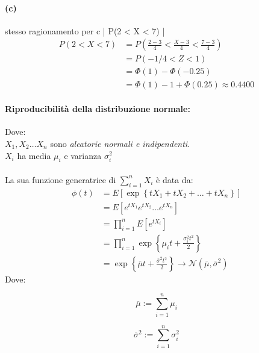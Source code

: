 \documentclass[]{article}
\begin{document}
    \paragraph{(c)} stesso ragionamento per c | P(2 < X < 7) |
    \begin{equation*}
        \begin{split}
            P(2 < X < 7) &= P(\frac{2 - 3}{4} < \frac{X - 3}{4} < \frac{7 - 3}{4}) \\
            &= P(-1/4 < Z < 1) \\
            &= \Phi(1) - \Phi(-0.25) \\
            &= \Phi(1) - 1 + \Phi(0.25) \approx 0.4400
        \end{split}
    \end{equation*}

    \paragraph{Riproducibilità della distribuzione normale:} Dove: \\
    $X_1, X_2 \ldots X_n$ sono \textit{aleatorie normali e indipendenti}. \\ 
    $X_i$ ha media $\mu_i$ e varianza $\sigma^{2}_i$ \\ \\
    La sua funzione generatrice di $\sum_{i = 1}^{n} X_i$ è data da:
    \begin{equation}
        \begin{aligned}
            \phi(t) & =E\left[\exp \left\{t X_1+t X_2+\ldots+t X_n\right\}\right] \\
            & =E\left[e^{t X_1} e^{t X_2} \ldots e^{t X_n}\right] \\
            & =\prod_{i=1}^n E\left[e^{t X_i}\right] \\
            & =\prod_{i=1}^n \exp \left\{\mu_i t+\frac{\sigma_i^2 t^2}{2}\right\} \\
            & =\exp \left\{\bar{\mu} t+\frac{\bar{\sigma}^2 t^2}{2}\right\} \longrightarrow \mathcal{N}(\overline{\mu}, \overline{\sigma}^2)
        \end{aligned}
    \end{equation}
    Dove: \\
    \begin{minipage}{0.45\textwidth}
        \[ \overline{\mu} := \sum_{i = 1}^{n} \mu_i \]
    \end{minipage}
    \begin{minipage}{0.45\textwidth}
        \[ \overline{\sigma}^2 := \sum_{i = 1}^{n} \sigma^2_i\]
    \end{minipage} \\
\end{document}
